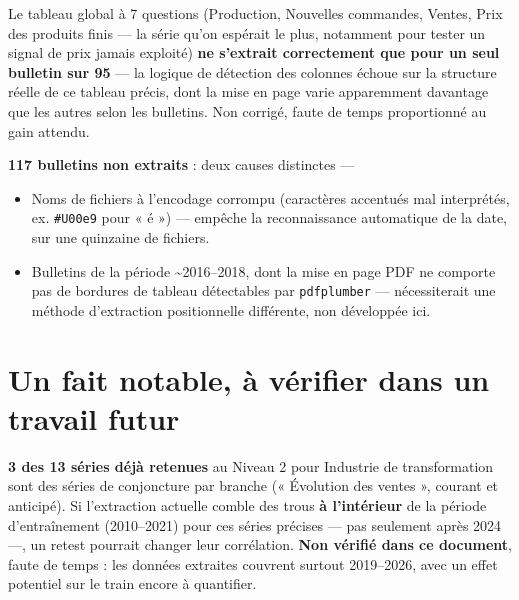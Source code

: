 \documentclass[11pt,a4paper]{article}
\begin{document}
\begin{alertebox}
Le tableau global à 7 questions (Production, Nouvelles commandes, Ventes, Prix des produits finis --- la série qu'on espérait le plus, notamment pour tester un signal de prix jamais exploité) \textbf{ne s'extrait correctement que pour un seul bulletin sur 95} --- la logique de détection des colonnes échoue sur la structure réelle de ce tableau précis, dont la mise en page varie apparemment davantage que les autres selon les bulletins. Non corrigé, faute de temps proportionné au gain attendu.
\end{alertebox}

\textbf{117 bulletins non extraits} : deux causes distinctes ---
\begin{itemize}[leftmargin=1.3em]
\item Noms de fichiers à l'encodage corrompu (caractères accentués mal interprétés, ex. \texttt{\#U00e9} pour « é ») --- empêche la reconnaissance automatique de la date, sur une quinzaine de fichiers.
\item Bulletins de la période \textasciitilde2016--2018, dont la mise en page PDF ne comporte pas de bordures de tableau détectables par \texttt{pdfplumber} --- nécessiterait une méthode d'extraction positionnelle différente, non développée ici.
\end{itemize}

\section{Un fait notable, à vérifier dans un travail futur}

\begin{fichebox}
\textbf{3 des 13 séries déjà retenues} au Niveau 2 pour Industrie de transformation sont des séries de conjoncture par branche (« Évolution des ventes », courant et anticipé). Si l'extraction actuelle comble des trous \textbf{à l'intérieur} de la période d'entraînement (2010--2021) pour ces séries précises --- pas seulement après 2024 ---, un retest pourrait changer leur corrélation. \textbf{Non vérifié dans ce document}, faute de temps : les données extraites couvrent surtout 2019--2026, avec un effet potentiel sur le train encore à quantifier.
\end{fichebox}

\end{document}
